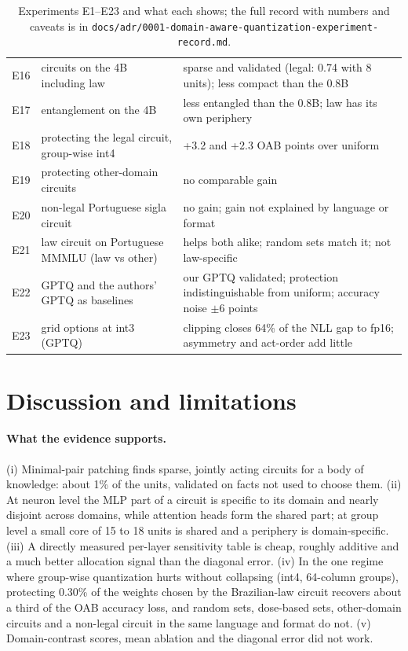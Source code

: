 \documentclass[11pt]{article}
\newcommand{\code}[1]{\texttt{#1}}
\begin{document}
\begin{table}[h]
\begin{tabular}{@{}rp{5.3cm}p{8.2cm}@{}}
E16 & circuits on the 4B including law & sparse and validated (legal: 0.74 with 8 units); less compact than the 0.8B\\
E17 & entanglement on the 4B & less entangled than the 0.8B; law has its own periphery\\
E18 & protecting the legal circuit, group-wise int4 & +3.2 and +2.3 OAB points over uniform\\
E19 & protecting other-domain circuits & no comparable gain\\
E20 & non-legal Portuguese sigla circuit & no gain; gain not explained by language or format\\
E21 & law circuit on Portuguese MMMLU (law vs other) & helps both alike; random sets match it; not law-specific\\
E22 & GPTQ and the authors' GPTQ as baselines & our GPTQ validated; protection indistinguishable from uniform; accuracy noise $\pm6$ points\\
E23 & grid options at int3 (GPTQ) & clipping closes 64\% of the NLL gap to fp16; asymmetry and act-order add little\\
\bottomrule
\end{tabular}
\caption{Experiments E1--E23 and what each shows; the full record with numbers and caveats is in \code{docs/adr/0001-domain-aware-quantization-experiment-record.md}.}
\label{tab:summary}
\end{table}

\section{Discussion and limitations}
\paragraph{What the evidence supports.}
(i) Minimal-pair patching finds sparse, jointly acting circuits for a body of knowledge: about 1\% of the units, validated on facts not used to choose them. (ii) At neuron level the MLP part of a circuit is specific to its domain and nearly disjoint across
domains, while attention heads form the shared part; at group level a small core of 15 to 18 units is shared and a periphery is domain-specific. (iii) A directly measured per-layer sensitivity table is cheap, roughly additive and a much better allocation
signal than the diagonal error. (iv) In the one regime where group-wise quantization hurts without collapsing (int4, 64-column groups), protecting 0.30\% of the weights chosen by the Brazilian-law circuit recovers about a third of the OAB accuracy loss, and
random sets, dose-based sets, other-domain circuits and a non-legal circuit in the same language and format do not. (v) Domain-contrast scores, mean ablation and the diagonal error did not work.
\end{document}
